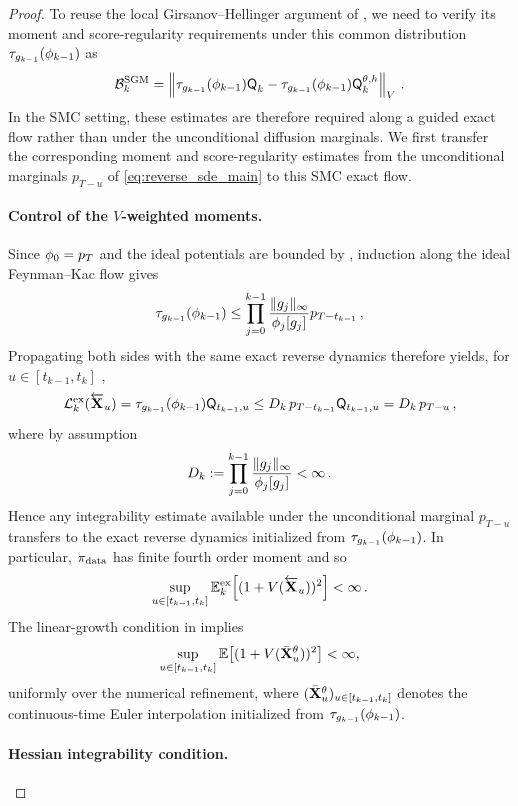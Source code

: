 \documentclass[11pt]{article}
\theoremstyle{plain}
\theoremstyle{definition}
\theoremstyle{remark}
\begin{document}
\begin{proof}
To reuse the local Girsanov--Hellinger argument of
\citet[Section~H.2]{strasman2026forgetting}, we need to verify
its moment and score-regularity requirements under this common distribution $\tau_{\pot{k-1}}(\filter{k-1})$ as 
$$
\mathcal B_k^{\rm SGM} = \vnorm[ \tau_{\pot{k-1}}(\filter{k-1})\mk{k}[] - \tau_{\pot{k-1}}(\filter{k-1})\mk{k}[\theta,h] ][V]  \eqsp.
$$
In the SMC setting, these estimates are therefore required along a
guided exact flow rather than under the unconditional diffusion
marginals. We first transfer the corresponding moment and
score-regularity estimates from the unconditional marginals
$p_{T-u}$ of \eqref{eq:reverse_sde_main} to this SMC exact flow.

\paragraph{Control of the $V$-weighted moments.} Since $\filter{0}=p_T$ and the ideal potentials are bounded by , induction
along the ideal Feynman--Kac flow gives
$$
\tau_{\pot{k-1}}(\filter{k-1}) \le \prod_{j=0}^{k-1}
\frac{\|\pot{j}\|_\infty}{\filter{j}[\pot{j}]} p_{T-t_{k-1}} \eqsp,
$$
Propagating both sides with the same exact reverse dynamics therefore yields, for $u\in[t_{k-1},t_k]$ \eqsp,
$$
\mathcal L_k^{\rm ex}(\Xola_u) = \tau_{\pot{k-1}}(\filter{k-1})\mk{t_{k-1},u} \le D_k\,p_{T-t_{k-1}}\mk{t_{k-1},u} = D_k\,p_{T-u} \eqsp,
$$
where by assumption
$$
D_k \eqdef \prod_{j=0}^{k-1} \frac{\|\pot{j}\|_\infty}{\filter{j}[\pot{j}]} < \infty \eqsp.
$$
%
Hence any integrability estimate available under the unconditional marginal $p_{T-u}$ transfers to the exact reverse dynamics initialized from $\tau_{\pot{k-1}}(\filter{k-1})$. In particular, $\pi_{\mathrm{data}}$ has finite fourth order moment and so
$$
\sup_{u\in[t_{k-1},t_k]} \mathbb E_k^{\rm ex}\!\left[(1+V(\overleftarrow{\mathbf{X}}_u))^2\right] < \infty \,.
$$
The linear-growth condition in  implies
$$
\sup_{u\in[t_{k-1},t_k]} \mathbb E\!\left[ (1+V(\bar{\mathbf{X}}_u^\theta))^2 \right] < \infty,
$$
uniformly over the numerical refinement, where $(\bar{\mathbf{X}}_u^\theta)_{u\in[t_{k-1},t_k]}$ denotes the continuous-time Euler interpolation initialized from $\tau_{\pot{k-1}}(\filter{k-1})$.

\paragraph{Hessian integrability condition.}


\end{proof}
\end{document}
